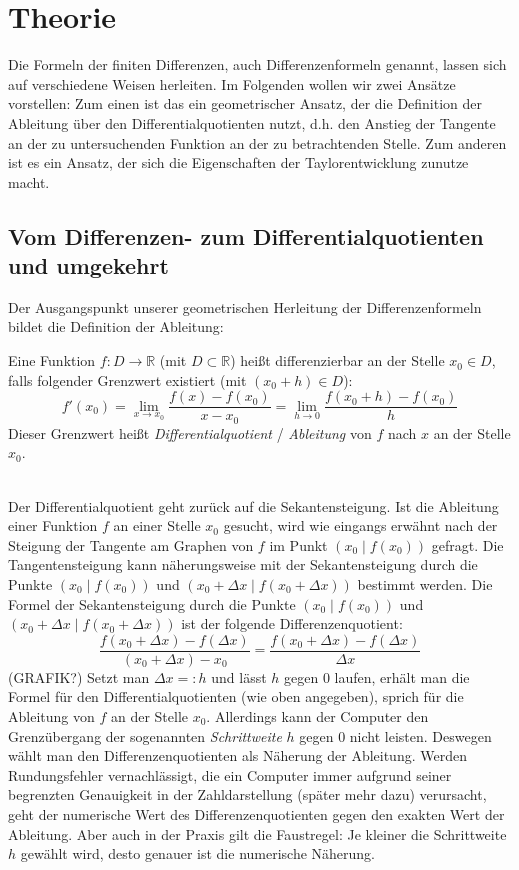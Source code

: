\documentclass{scrartcl}
\begin{document}
\pagebreak \section{Theorie}
\label{sec:theorie}
Die Formeln der finiten Differenzen, auch Differenzenformeln genannt, lassen sich auf verschiedene Weisen herleiten. Im Folgenden wollen wir zwei Ansätze vorstellen: Zum einen ist das ein geometrischer Ansatz, der die Definition der Ableitung über den Differentialquotienten nutzt, d.h. den Anstieg der Tangente an der zu untersuchenden Funktion an der zu betrachtenden Stelle. Zum anderen ist es ein Ansatz, der sich die Eigenschaften der Taylorentwicklung zunutze macht.

\subsection{Vom Differenzen- zum Differentialquotienten und umgekehrt}
\label{ssec:herleitung1}
Der Ausgangspunkt unserer geometrischen Herleitung der Differenzenformeln bildet die Definition der Ableitung:
\begin{shaded} Eine Funktion $f:D \rightarrow \mathbb{R}$ (mit $D\subset \mathbb{R}$) heißt differenzierbar an der Stelle $x_0 \in D$, falls folgender Grenzwert existiert (mit $(x_0+h) \in D$): \[f'(x_0) = \lim _{x\to x_0} {\frac {f(x)-f(x_0)}{x-x_0}} = \lim _{h\to 0} {\frac {f(x_0+h)-f(x_0)}{h}}\] Dieser Grenzwert heißt \textit{Differentialquotient} / \textit{Ableitung} von $f$ nach $x$ an der Stelle $x_0$. \end{shaded} \\
Der Differentialquotient geht zurück auf die Sekantensteigung. Ist die Ableitung einer Funktion $f$ an einer Stelle $x_0$ gesucht, wird wie eingangs erwähnt nach der Steigung der Tangente am Graphen von $f$ im Punkt $(x_0 \mid f(x_0))$ gefragt. Die Tangentensteigung kann näherungsweise mit der Sekantensteigung durch die Punkte $(x_0 \mid f(x_0))$ und $(x_0 + \Delta x \mid f(x_0 + \Delta x))$ bestimmt werden. Die Formel der Sekantensteigung durch die Punkte $(x_0 \mid f(x_0))$ und $(x_0 + \Delta x \mid f(x_0 + \Delta x))$ ist der folgende Differenzenquotient: \[\frac {f(x_0 + \Delta x)-f(\Delta x)}{(x_0 + \Delta x) - x_0} = \frac {f(x_0 + \Delta x)-f(\Delta x)}{\Delta x}\]
(GRAFIK?)
Setzt man $\Delta x =: h$ und lässt $h$ gegen $0$ laufen, erhält man die Formel für den Differentialquotienten (wie oben angegeben), sprich für die Ableitung von $f$ an der Stelle $x_0$. Allerdings kann der Computer den Grenzübergang der sogenannten \textit{Schrittweite} $h$ gegen $0$ nicht leisten. Deswegen wählt man den Differenzenquotienten als Näherung der Ableitung. Werden Rundungsfehler vernachlässigt, die ein Computer immer aufgrund seiner begrenzten Genauigkeit in der Zahldarstellung (später mehr dazu) verursacht, geht der numerische Wert des Differenzenquotienten gegen den exakten Wert der Ableitung. Aber auch in der Praxis gilt die Faustregel: Je kleiner die Schrittweite $h$ gewählt wird, desto genauer ist die numerische Näherung. \\
\end{document}
